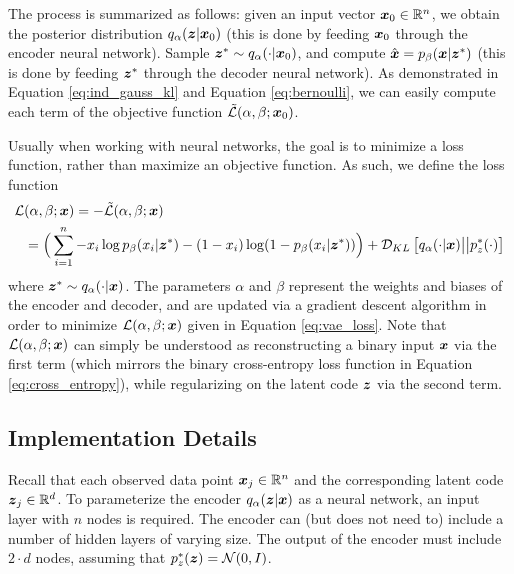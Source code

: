 The process is summarized as follows: given an input vector $\boldsymbol{x}_0 \in \mathbb{R}^n$, we obtain the posterior distribution $q_\alpha(\boldsymbol{z} | \boldsymbol{x}_0)$ (this is done by feeding $\boldsymbol{x}_0$ through the encoder neural network). Sample $\boldsymbol{z}^* \sim q_\alpha(\cdot |\boldsymbol{x}_0)$, and compute $\hat{\boldsymbol{x}} = p_\beta(\boldsymbol{x} | \boldsymbol{z}^*)$ (this is done by feeding $\boldsymbol{z}^*$ through the decoder neural network). As demonstrated in Equation \ref{eq:ind_gauss_kl} and Equation \ref{eq:bernoulli}, we can easily compute each term of the objective function $\tilde{\mathcal{L}}(\alpha, \beta; \boldsymbol{x}_0)$.

Usually when working with neural networks, the goal is to minimize a loss function, rather than maximize an objective function. As such, we define the loss function 
\begin{equation}
  \label{eq:vae_loss}
  \begin{split}
  \mathcal{L}&(\alpha, \beta; \boldsymbol{x}) = - \tilde{\mathcal{L}}(\alpha, \beta;\boldsymbol{x}) \\
  &= \Big(\sum_{i=1}^n - x_i\log p_\beta(x_i | \boldsymbol{z}^*) - (1-x_i)\log (1-p_\beta(x_i | \boldsymbol{z}^*)) \Big) + \mathcal{D}_{KL}\left[ q_\alpha(\cdot | \boldsymbol{x}) \big|\big| p_z^*(\cdot) \right]
  \end{split}
\end{equation}
where $\boldsymbol{z}^* \sim q_\alpha(\cdot | \boldsymbol{x})$. The parameters $\alpha$ and $\beta$ represent the weights and biases of the encoder and decoder, and are updated via a gradient descent algorithm in order to minimize $\mathcal{L}(\alpha, \beta; \boldsymbol{x})$ given in Equation \ref{eq:vae_loss}. Note that $\mathcal{L}(\alpha, \beta; \boldsymbol{x})$ can simply be understood as reconstructing a binary input $\boldsymbol{x}$ via the first term (which mirrors the binary cross-entropy loss function in Equation \ref{eq:cross_entropy}), while regularizing on the latent code $\boldsymbol{z}$ via the second term.


\subsection{Implementation Details}
Recall that each observed data point $\boldsymbol{x}_j \in \mathbb{R}^n$ and the corresponding latent code $\boldsymbol{z}_j \in \mathbb{R}^d$. To parameterize the encoder $q_\alpha(\boldsymbol{z} | \boldsymbol{x})$ as a neural network, an input layer with $n$ nodes is required. The encoder can (but does not need to) include a number of hidden layers of varying size. The output of the encoder must include $2\cdot d$ nodes, assuming that $p_z^*(\boldsymbol{z}) = \mathcal{N}(0,I)$. 

